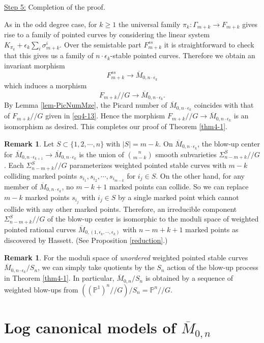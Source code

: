 \documentclass[10pt]{amsart}
\theoremstyle{definition}
\newtheorem{remark}[theorem]{Remark}
\newcommand{\PP}{\mathbb{P}}
\def\Mzn{\overline{M}_{0,n} }
\def\Mzek{\overline{M}_{0,n\cdot \epsilon_k} }
\def\git{/\!/ }
\begin{document}
\bigskip
\noindent \underline{Step 5:} Completion of the proof.

\bigskip
As in the odd degree case, for $k\ge 1$ the universal
family $\pi_k:\Gamma_{m+k}\to F_{m+k}$ gives rise to a family of
pointed curves by considering the linear system
$K_{\pi_k}+\epsilon_k\sum_i\sigma^i_{m+k}$. Over the semistable
part $F_{m+k}^{ss}$ it is straightforward to check that this gives
us a family of $n\cdot \epsilon_k$-stable pointed curves.
Therefore we obtain an invariant morphism $$F_{m+k}^{ss}\to
\Mzek$$ which induces a morphism $$F_{m+k}\git G\to \Mzek.$$ By
Lemma \ref{lem-PicNumMze}, the Picard number of $\Mzek$ coincides
with that of $F_{m+k}\git G$ given in \eqref{eq4-13}. Hence the
morphism $F_{m+k}\git G\to \Mzek$ is an isomorphism as desired.
This completes our proof of Theorem \ref{thm4-1}.


\begin{remark}\label{2010rem1}
Let $S \subset \{1, 2, \cdots, n\}$ with $|S| = m-k$. On
$\overline{M}_{0,n\cdot \epsilon_{k}}$, the blow-up center for
$\overline{M}_{0,n\cdot \epsilon_{k+1}}\to\Mzek$ is the union of
$n \choose {m-k}$ smooth subvarieties $\Sigma_{n-m+k}^S\git G$.
Each $\Sigma_{n-m+k}^S \git G$ parameterizes weighted pointed
stable curves with $m-k$ colliding marked points $s_{i_1},
s_{i_2}, \cdots, s_{i_{m-k}}$ for $i_j \in S$. On the other hand,
for any member of $\Mzek$, no $m-k+1$ marked points can collide.
So we can replace $m-k$ marked points $s_{i_j}$ with $i_j \in S$
by a single marked point which cannot collide with any other
marked points. Therefore, an irreducible component
$\Sigma_{n-m+k}^S \git G$ of the blow-up center is isomorphic to
the moduli space of weighted pointed rational curves
$\overline{M}_{0, (1, \epsilon_k, \cdots, \epsilon_k)}$ with
$n-m+k+1$ marked points as discovered by Hassett. (See Proposition
\ref{reduction}.)
\end{remark}


\begin{remark}
For the moduli space of \emph{unordered} weighted pointed stable
curves $\Mzek/S_n$, we can simply take quotients by the $S_n$
action of the blow-up process in Theorem \ref{thm4-1}. In
particular, $\Mzn/S_n$ is obtained by a sequence of weighted
blow-ups from $\left((\PP^1)^n\git G\right)/ S_n=\PP^n\git G.$
\end{remark}



\section{Log canonical models of $\Mzn$}\label{sec6}
\end{document}

